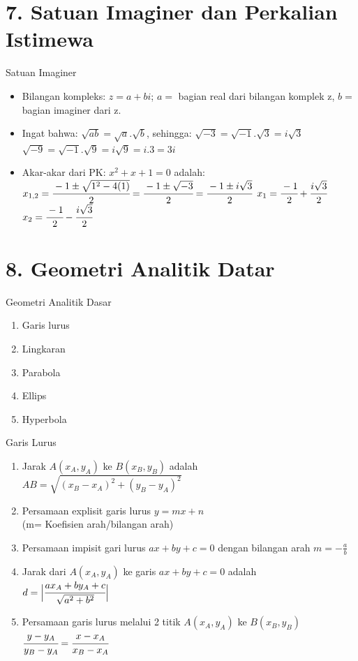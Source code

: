 \documentclass{beamer}
\begin{document}

\section{7. Satuan Imaginer dan Perkalian Istimewa}
\begin{frame}[t, fragile]{Satuan Imaginer}
\begin{center} 
\vskip12pt
\begin{itemize}
\item Bilangan kompleks: $z=a+bi$; $a=$ bagian real dari bilangan komplek z,
                                    $b=$ bagian imaginer dari z.
\item Ingat bahwa: $\sqrt{ab}=\sqrt{a}.\sqrt{b}$, sehingga: $\sqrt{-3}=\sqrt{-1}.\sqrt{3}=i\sqrt{3}$
\\
$\sqrt{-9}=\sqrt{-1}.\sqrt{9}=i\sqrt{9}=i.3=3i$
\item Akar-akar dari PK: $x^2+x+1=0$ adalah:
\vskip10pt
$x_{1,2}=\cfrac{-1\pm\sqrt{1^2-4(1)}}{2}=\cfrac{-1\pm\sqrt{-3}}{2}=\cfrac{-1\pm i\sqrt{3}}{2}$
$x_{1}=\cfrac{-1}{2}+\cfrac{i\sqrt{3}}{2}$
\hskip40pt
$x_{2}=\cfrac{-1}{2}-\cfrac{i\sqrt{3}}{2}$
\end{itemize}
\end{center}
\end{frame}

\section{8. Geometri Analitik Datar }
\begin{frame}[t, fragile]{Geometri Analitik Dasar}
\begin{enumerate}
\item Garis lurus
\item Lingkaran
\item Parabola
\item Ellips
\item Hyperbola
\end{enumerate}
\end{frame}

\begin{frame}[t, fragile]{Garis Lurus}
\begin{enumerate}
\item Jarak $A(x_A, y_A)$ ke $B(x_B,y_B)$ adalah $AB=\sqrt{(x_B-x_A)^2+(y_B-y_A)^2}$
\item Persamaan explisit garis lurus $y=mx+n$\\
      (m= Koefisien arah/bilangan arah)
\item Persamaan impisit gari lurus $ax+by+c=0$ dengan bilangan arah $m=-\frac{a}{b}$
\item Jarak dari $A(x_A, y_A)$ ke garis $ax+by+c=0$ adalah\\
      $d=\Bigl\vert\cfrac{ax_{A}+by_{A}+c}{\sqrt{a^2+b^2}}\Bigr\vert$
\item Persamaan garis lurus melalui  2 titik  $A(x_A, y_A)$ ke $B(x_B,y_B)$ \\
      $\cfrac{y-y_A}{y_B-y_A}=\cfrac{x-x_A}{x_B-x_A}$
\end{enumerate}
\end{frame}
\end{document}
